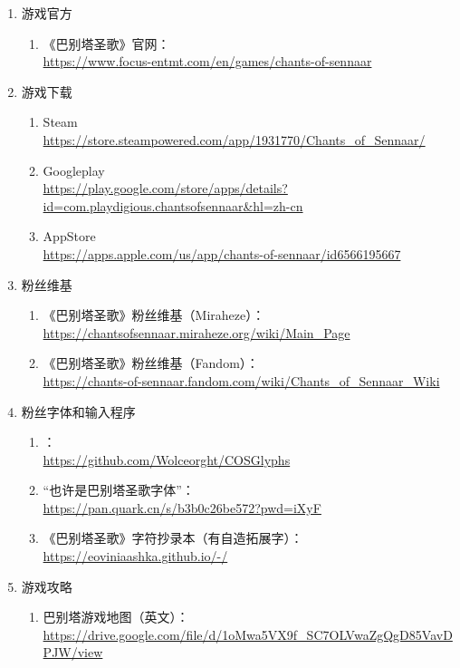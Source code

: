 \documentclass[twoside,12pt]{article} %
\renewcommand\DictGlyphFont{\COSGlyphFont}
\begin{document}
\begin{enumerate}
\item 游戏官方
  \begin{enumerate}
  \item《巴别塔圣歌》官网：\\ \url{https://www.focus-entmt.com/en/games/chants-of-sennaar}
  \end{enumerate}
  
\item 游戏下载
  \begin{enumerate}
  \item Steam \\ \url{https://store.steampowered.com/app/1931770/Chants_of_Sennaar/}
  \item Googleplay \\ \url{https://play.google.com/store/apps/details?id=com.playdigious.chantsofsennaar&hl=zh-cn} 
  \item AppStore \\ \url{https://apps.apple.com/us/app/chants-of-sennaar/id6566195667}
  \end{enumerate}
  
\item 粉丝维基
  \begin{enumerate}
  \item 《巴别塔圣歌》粉丝维基（Miraheze）：\\ \url{https://chantsofsennaar.miraheze.org/wiki/Main_Page}
  \item 《巴别塔圣歌》粉丝维基（Fandom）：\\ \url{https://chants-of-sennaar.fandom.com/wiki/Chants_of_Sennaar_Wiki}
  \end{enumerate}

\item 粉丝字体和输入程序
  \begin{enumerate}
  \item {\DictGlyphFont{COSGlyphs}}：\\ \url{https://github.com/Wolceorght/COSGlyphs}
  \item “也许是巴别塔圣歌字体”：\\ \url{https://pan.quark.cn/s/b3b0c26be572?pwd=iXyF}
  \item 《巴别塔圣歌》字符抄录本（有自造拓展字）：\\ \url{https://eoviniaashka.github.io/-/}
  \end{enumerate}

\item 游戏攻略
  \begin{enumerate}
  \item 巴别塔游戏地图（英文）：\\ \url{https://drive.google.com/file/d/1oMwa5VX9f_SC7OLVwaZgQgD85VavDPJW/view}
  \end{enumerate}
  
\end{enumerate}
\end{document}
